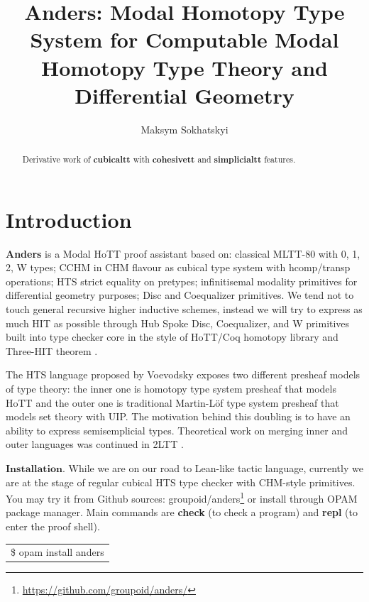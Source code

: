 \documentclass[a4paper,UKenglish,cleveref, autoref, thm-restate]{lipics-v2021}
\title{Anders: Modal Homotopy Type System for Computable Modal Homotopy Type Theory and Differential Geometry}
\author{Maksym Sokhatskyi}{Groupoid Infinity}{maxim@synrc.com}{https://orcid.org/0000-0001-7127-8796}{}
\begin{document}
\maketitle

\begin{abstract}
Derivative work of \textbf{cubicaltt} with \textbf{cohesivett} and \textbf{simplicialtt} features.
\end{abstract}

\tableofcontents

\newpage
\section{Introduction}
\label{sec:typesetting-summary}

\textbf{Anders} is a Modal HoTT proof assistant based on: classical MLTT-80 \cite{MLTT80}
with 0, 1, 2, W types; CCHM \cite{CCHM} in CHM \cite{CHM} flavour as cubical type system with
hcomp/transp operations; HTS \cite{HTS} strict equality on pretypes;
infinitisemal \cite{deRham} modality primitives for differential geometry purposes; Disc and Coequalizer primitives.
We tend not to touch general recursive higher inductive schemes,
instead we will try to express as much HIT as possible through Hub Spoke Disc, Coequalizer, and W
primitives built into type checker core in the style of HoTT/Coq homotopy library and Three-HIT theorem \cite{ThreeHIT}.

The HTS language proposed by Voevodsky exposes two different presheaf models of type theory:
the inner one is homotopy type system presheaf that models HoTT and the outer one is
traditional Martin-Löf type system presheaf that models set theory with UIP.
The motivation behind this doubling is to have an ability to express semisemplicial types.
Theoretical work on merging inner and outer languages was continued in 2LTT \cite{2LTT}.

$\mathbf{Installation}$. While we are on our road to Lean-like tactic language, currently we are at the stage of
regular cubical HTS type checker with CHM-style primitives. You may try it from Github
sources: groupoid/anders\footnote{\url{https://github.com/groupoid/anders/}} or install
through OPAM package manager. Main commands are \textbf{check} (to check a program)
and \textbf{repl} (to enter the proof shell).

\begin{table}[ht!]
\centering
\begin{tabular}{l}
\$ opam install anders
\end{tabular}
\end{table}
\end{document}
